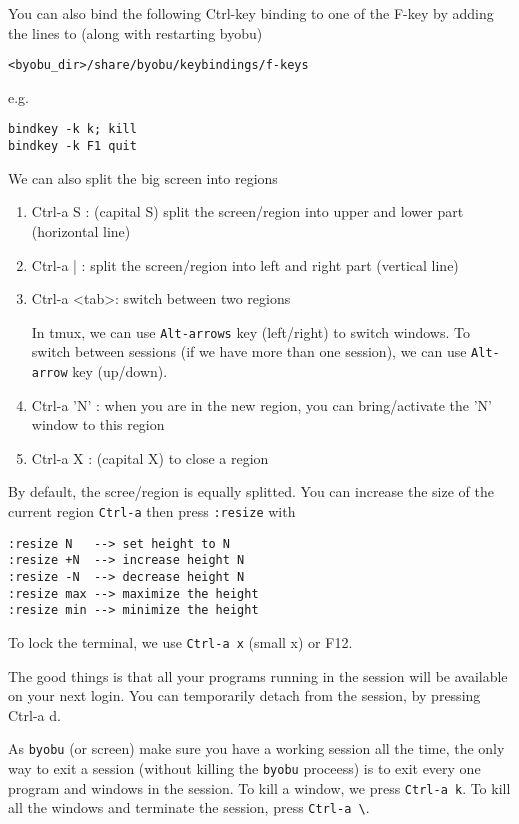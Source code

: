 You can also bind the following Ctrl-key binding to one of the F-key by adding
the lines to (along with restarting byobu) 
\begin{verbatim}
<byobu_dir>/share/byobu/keybindings/f-keys 
\end{verbatim}
e.g.
\begin{verbatim}
bindkey -k k; kill
bindkey -k F1 quit
\end{verbatim}


We can also split the big screen into regions
\begin{enumerate}
  \item Ctrl-a S : (capital S) split the screen/region into upper and lower part
  (horizontal line)
  \item Ctrl-a | : split the screen/region into left and right part (vertical
  line)
  \item Ctrl-a <tab>: switch between two regions
  
In tmux, we can use \verb!Alt-arrows! key (left/right) to switch windows. To
switch between sessions (if we have more than one session), we can use
\verb!Alt-arrow! key (up/down).


  \item Ctrl-a 'N' : when you are in the new region, you can bring/activate the
  'N' window to this region 

  \item Ctrl-a X : (capital X) to close a region
\end{enumerate}
By default, the scree/region is equally splitted. You can increase the size of
the current region \verb!Ctrl-a! then press \verb!:resize! with
\begin{verbatim}
:resize N   --> set height to N
:resize +N  --> increase height N
:resize -N  --> decrease height N
:resize max --> maximize the height
:resize min --> minimize the height
\end{verbatim}


To lock the terminal, we use \verb!Ctrl-a x! (small x) or F12.


The good things is that all your programs running in the session will be
available on your next login. You can temporarily detach from the session, by
pressing Ctrl-a d.


\begin{framed}
As \verb!byobu! (or screen) make sure you have a working session all the time,
the only way to exit a session (without killing the \verb!byobu! proceess) is to
exit every one program and windows in the session. To kill a window, we press
\verb!Ctrl-a k!. To kill all the windows and terminate the session, press
\verb!Ctrl-a \!. 
\end{framed}


